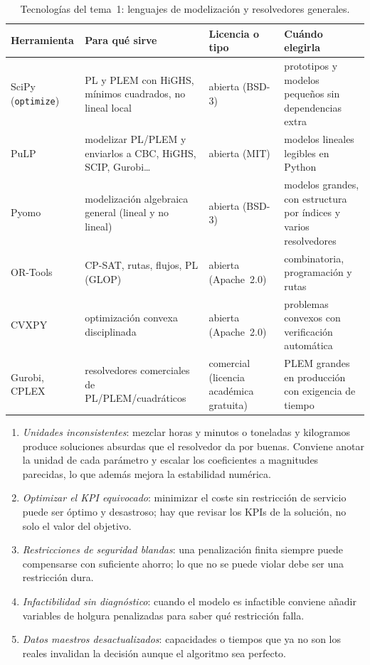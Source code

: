 \begin{table}[h]
\centering\small
\caption{Tecnologías del tema~1: lenguajes de modelización y resolvedores generales.}\label{tab:tec1}
\begin{tabularx}{\textwidth}{@{}l>{\raggedright\arraybackslash}X>{\raggedright\arraybackslash}p{2.2cm}>{\raggedright\arraybackslash}X@{}}
\toprule
Herramienta & Para qué sirve & Licencia o tipo & Cuándo elegirla \\
\midrule
SciPy (\texttt{optimize}) & PL y PLEM con HiGHS, mínimos cuadrados, no lineal local & abierta (BSD-3) & prototipos y modelos pequeños sin dependencias extra \\
PuLP~\cite{pulp} & modelizar PL/PLEM y enviarlos a CBC, HiGHS, SCIP, Gurobi\dots & abierta (MIT) & modelos lineales legibles en Python \\
Pyomo & modelización algebraica general (lineal y no lineal) & abierta (BSD-3) & modelos grandes, con estructura por índices y varios resolvedores \\
OR-Tools~\cite{ortools-cpsat} & CP-SAT, rutas, flujos, PL (GLOP) & abierta (Apache~2.0) & combinatoria, programación y rutas \\
CVXPY~\cite{cvxpy} & optimización convexa disciplinada & abierta (Apache~2.0) & problemas convexos con verificación automática \\
Gurobi, CPLEX & resolvedores comerciales de PL/PLEM/cuadráticos & comercial (licencia académica gratuita) & PLEM grandes en producción con exigencia de tiempo \\
\bottomrule
\end{tabularx}
\end{table}

\begin{observacion}\label{obs:errores1}
\begin{enumerate}[label=(\alph*)]
  \item \emph{Unidades inconsistentes}: mezclar horas y minutos o toneladas y kilogramos produce soluciones absurdas que el resolvedor da por buenas. Conviene anotar la unidad de cada parámetro y escalar los coeficientes a magnitudes parecidas, lo que además mejora la estabilidad numérica.
  \item \emph{Optimizar el KPI equivocado}: minimizar el coste sin restricción de servicio puede ser óptimo y desastroso; hay que revisar los KPIs de la solución, no solo el valor del objetivo.
  \item \emph{Restricciones de seguridad blandas}: una penalización finita siempre puede compensarse con suficiente ahorro; lo que no se puede violar debe ser una restricción dura.
  \item \emph{Infactibilidad sin diagnóstico}: cuando el modelo es infactible conviene añadir variables de holgura penalizadas para saber qué restricción falla.
  \item \emph{Datos maestros desactualizados}: capacidades o tiempos que ya no son los reales invalidan la decisión aunque el algoritmo sea perfecto.
\end{enumerate}
\end{observacion}

